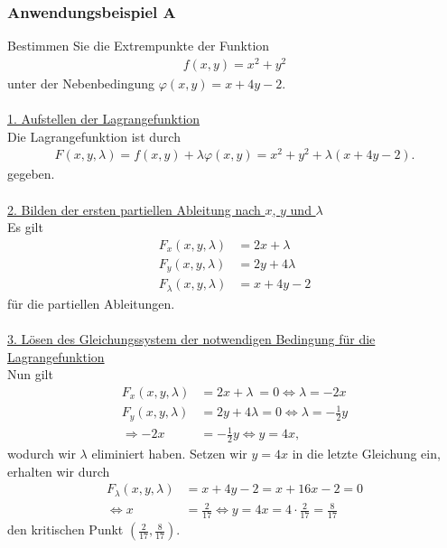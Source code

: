 \subsubsection*{Anwendungsbeispiel A}
Bestimmen Sie die Extrempunkte der Funktion
\begin{align*}
f(x,y) = x^2 +y^2
\end{align*}
unter der Nebenbedingung $\varphi(x,y) = x +4 y -2$.\\
\\
\underline{1. Aufstellen der Lagrangefunktion}\\
Die Lagrangefunktion ist durch
\begin{align*}
F(x,y,\lambda) = f(x,y) + \lambda \varphi(x,y) 
= x^2 +y^2 + \lambda(x +4 y -2).
\end{align*}
gegeben.\\
\\
\underline{2. Bilden der ersten partiellen Ableitung nach $x$, $y$ und $\lambda$}\\
Es gilt
\begin{align*}
F_x(x,y,\lambda) &= 2x + \lambda\\
F_y(x,y,\lambda) &= 2y + 4 \lambda\\
F_\lambda(x,y,\lambda) &= x+ 4y -2
\end{align*}
für die partiellen Ableitungen.\\
\\
\underline{3. Lösen des Gleichungssystem der notwendigen Bedingung für die Lagrangefunktion}\\
Nun gilt
\begin{align*}
F_x(x,y,\lambda) &= 2x + \lambda\ = 0 
\Leftrightarrow
\lambda = -2x\\
F_y(x,y,\lambda) &= 2y + 4 \lambda = 0
\Leftrightarrow 
\lambda = - \frac{1}{2}y\\
\Rightarrow
-2x &= - \frac{1}{2} y
\Leftrightarrow
y = 4 x,
\end{align*}
wodurch wir $\lambda$ eliminiert haben.
Setzen wir $y = 4x $ in die letzte Gleichung ein, erhalten wir durch
\begin{align*}
F_\lambda(x,y,\lambda) &= x +4y -2 = x + 16 x -2 = 0\\
\Leftrightarrow
x &= \frac{2}{17}
\Leftrightarrow
y = 4x = 4 \cdot \frac{2}{17} = \frac{8}{17} 
\end{align*}
den kritischen Punkt $\left( \frac{2}{17}, \frac{8}{17} \right)$.\\
\\
